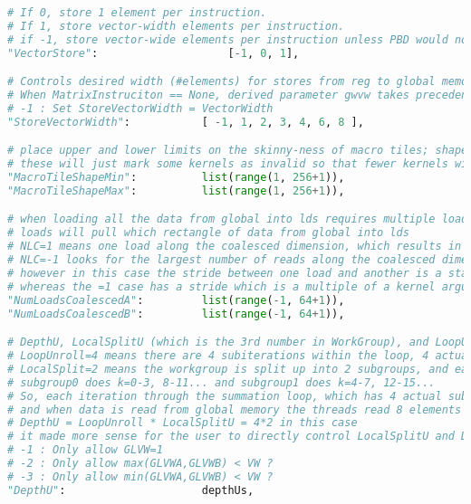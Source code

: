 \documentclass[]{article}
\begin{document}
\begin{lstlisting}[language=python,breaklines=true]
# If 0, store 1 element per instruction.
# If 1, store vector-width elements per instruction.
# if -1, store vector-wide elements per instruction unless PBD would not generate a valid kernel
"VectorStore":                    [-1, 0, 1],

# Controls desired width (#elements) for stores from reg to global memory.
# When MatrixInstruciton == None, derived parameter gwvw takes precedence.
# -1 : Set StoreVectorWidth = VectorWidth
"StoreVectorWidth":           [ -1, 1, 2, 3, 4, 6, 8 ],

# place upper and lower limits on the skinny-ness of macro tiles; shape=1 means square tile, like 64x64. shape=4 means 4x64 or 64x4 or 128x8...
# these will just mark some kernels as invalid so that fewer kernels will be checked
"MacroTileShapeMin":          list(range(1, 256+1)),
"MacroTileShapeMax":          list(range(1, 256+1)),

# when loading all the data from global into lds requires multiple load instructions, these parameters govern which
# loads will pull which rectangle of data from global into lds
# NLC=1 means one load along the coalesced dimension, which results in the most coalescing possible
# NLC=-1 looks for the largest number of reads along the coalesced dimension which results in the least ammount of coalescing;
# however in this case the stride between one load and another is a static value, therefore buffer loads only need one set of registers
# whereas the =1 case has a stride which is a multiple of a kernel argument and therefore needs one address per load in the perpendicular dimension
"NumLoadsCoalescedA":         list(range(-1, 64+1)),
"NumLoadsCoalescedB":         list(range(-1, 64+1)),

# DepthU, LocalSplitU (which is the 3rd number in WorkGroup), and LoopUnroll are closely related
# LoopUnroll=4 means there are 4 subiterations within the loop, 4 actual iterations written in the code.
# LocalSplit=2 means the workgroup is split up into 2 subgroups, and each subgroup is doing different parts of the summation.
# subgroup0 does k=0-3, 8-11... and subgroup1 does k=4-7, 12-15...
# So, each iteration through the summation loop, which has 4 actual subiterations, does 8 summation iterations, because each subgroup did 4;
# and when data is read from global memory the threads read 8 elements along the summation dimension.
# DepthU = LoopUnroll * LocalSplitU = 4*2 in this case
# it made more sense for the user to directly control LocalSplitU and DepthU, then derrive afterwards LoopUnroll=DepthU/LocalSplitU
# -1 : Only allow GLVW=1
# -2 : Only allow max(GLVWA,GLVWB) < VW ?
# -3 : Only allow min(GLVWA,GLVWB) < VW ?
"DepthU":                     depthUs,


\end{lstlisting}
\end{document}
